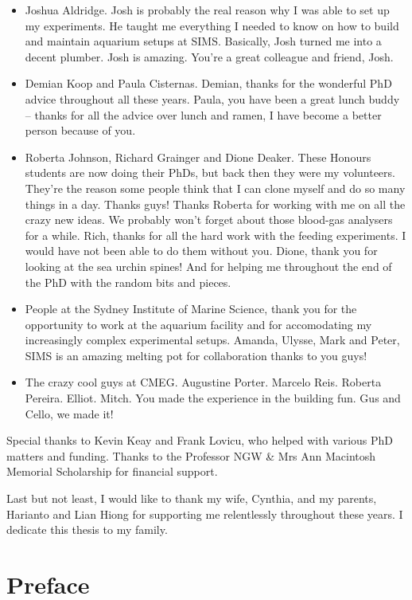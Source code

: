 \documentclass[
  oneside, 11pt, a4paper]{memoir}
\begin{document}
\begin{itemize}
  \item Joshua Aldridge. Josh is probably the real reason why I was able to set up my experiments. He taught me everything I needed to know on how to build and maintain aquarium setups at SIMS. Basically, Josh turned me into a decent plumber. Josh is amazing. You're a great colleague and friend, Josh.
  \item Demian Koop and Paula Cisternas. Demian, thanks for the wonderful PhD advice throughout all these years. Paula, you have been a great lunch buddy -- thanks for all the advice over lunch and ramen, I have become a better person because of you.
  \item Roberta Johnson, Richard Grainger and Dione Deaker. These Honours students are now doing their PhDs, but back then they were my volunteers. They're the reason some people think that I can clone myself and do so many things in a day. Thanks guys! Thanks Roberta for working with me on all the crazy new ideas. We probably won't forget about those blood-gas analysers for a while. Rich, thanks for all the hard work with the feeding experiments. I would have not been able to do them without you. Dione, thank you for looking at the sea urchin spines! And for helping me throughout the end of the PhD with the random bits and pieces.
  \item People at the Sydney Institute of Marine Science, thank you for the opportunity to work at the aquarium facility and for accomodating my increasingly complex experimental setups. Amanda, Ulysse, Mark and Peter, SIMS is an amazing melting pot for collaboration thanks to you guys! 
  \item The crazy cool guys at CMEG. Augustine Porter. Marcelo Reis. Roberta Pereira. Elliot. Mitch. You made the experience in the building fun. Gus and Cello, we made it!
\end{itemize}

Special thanks to Kevin Keay and Frank Lovicu, who helped with various PhD matters and funding. Thanks to the Professor NGW \& Mrs Ann Macintosh Memorial Scholarship for financial support.

Last but not least, I would like to thank my wife, Cynthia, and my parents, Harianto and Lian Hiong for supporting me relentlessly throughout these years. I dedicate this thesis to my family.


\clearpage


\cleardoublepage

\SingleSpacing

\chapter{Preface}
\end{document}
